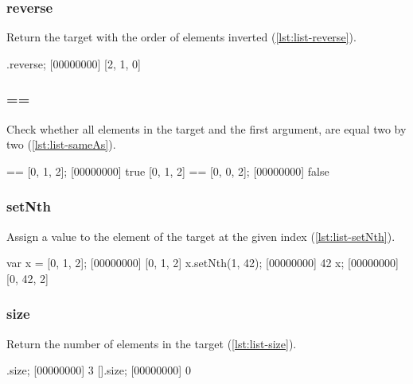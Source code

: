 \subsubsection{reverse}

Return the target with the order of elements inverted
(\autoref{lst:list-reverse}).

\begin{urbiscript}[caption=List.reverse, label=lst:list-reverse, float=\floatposh]
  [0, 1, 2].reverse;
  [00000000] [2, 1, 0]
\end{urbiscript}

\subsubsection{==}

Check whether all elements in the target and the first argument, are
equal two by two (\autoref{lst:list-sameAs}).

\begin{urbiscript}[caption={List.==}, label=lst:list-sameAs, float=\floatposh]
  [0, 1, 2] == [0, 1, 2];
  [00000000] true
  [0, 1, 2] == [0, 0, 2];
  [00000000] false
\end{urbiscript}

\subsubsection{setNth}
\label{sec:std-list-setnth}

Assign a value to the element of the target at the given index
(\autoref{lst:list-setNth}).

\begin{urbiscript}[caption=List.setNth, label=lst:list-setNth, float=\floatposh]
  var x = [0, 1, 2];
  [00000000] [0, 1, 2]
  x.setNth(1, 42);
  [00000000] 42
  x;
  [00000000] [0, 42, 2]
\end{urbiscript}

\subsubsection{size}

Return the number of elements in the target (\autoref{lst:list-size}).

\begin{urbiscript}[caption=List.size, label=lst:list-size, float=\floatposh]
  [1, 2, 3].size;
  [00000000] 3
  [].size;
  [00000000] 0
\end{urbiscript}

